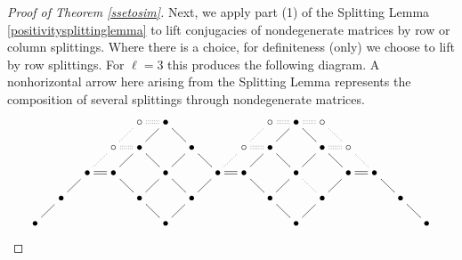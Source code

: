 \documentclass{amsart}
\theoremstyle{definition}
\theoremstyle{remark}
\numberwithin{equation}{section}
\begin{document}
{{\begin{proof}[Proof of Theorem 
\ref{ssetosim}]
Next, we apply part (1) of the Splitting Lemma 
\ref{positivitysplittinglemma}  to lift conjugacies of 
nondegenerate matrices by row or column splittings. 
Where there is a choice, for definiteness (only) we choose to lift by 
row splittings. For $\ell =3$ this produces 
the following diagram. A nonhorizontal arrow here arising from the Splitting 
Lemma represents the composition of several splittings through 
nondegenerate matrices. 
\begin{equation}
\xymatrix@=10pt{
    &                        &                            &                            & \circ \ar@{.}[dl] \ar@{:}[r]        & 
 \bullet \ar@{-}[dl]\ar@{-}[dr] &  &                 &  &\circ \ar@{.}[dl] \ar@{:}[r]                                    & 
 \bullet \ar@{-}[dl]\ar@{-}[dr]\ar@{:}[r] &\circ\ar@{.}[dr] &                 &                 &                & \\
    &                        &                            & \circ \ar@{.}[dl] \ar@{:}[r] & \bullet \ar@{-}[dl]\ar@{-}[dr] & 
    & \bullet \ar@{-}[dl]\ar@{-}[dr]  &                 & \circ \ar@{.}[dl] \ar@{:}[r] & \bullet \ar@{-}[dl]\ar@{-}[dr] & 
    & \bullet \ar@{-}[dl]\ar@{-}[dr] \ar@{:}[r] & \circ\ar@{.}[dr]                &                  &                & \\
    &                        & \bullet \ar@{-}[dl] \ar@{=}[r] & \bullet \ar@{-}[dr] &                & \bullet \ar@{-}[dl]\ar@{-}[dr]
    &                        & \bullet  \ar@{-}[dl] \ar@{=}[r] & \bullet \ar@{-}[dr] &                &  \bullet \ar@{-}[dl]\ar@{.}[dr]
    &                        & \bullet  \ar@{-}[dl] \ar@{=}[r] & \bullet \ar@{-}[dr] &                & \\
    & \bullet        \ar@{-}[dl] &                             &               & \bullet \ar@{-}[dr] &  
    & \bullet        \ar@{-}[dl] &                             &               & \bullet \ar@{-}[dr] &  
    & \bullet        \ar@{-}[dl] &                             &               & \bullet \ar@{-}[dr] &  \\
 \bullet &                    &                             &               &                 &   \bullet
         &                    &                             &               &                 &   \bullet 
          &                    &                             &               &                 &   \bullet 
}
\end{equation} 
 

\end{proof}}}
\end{document}
